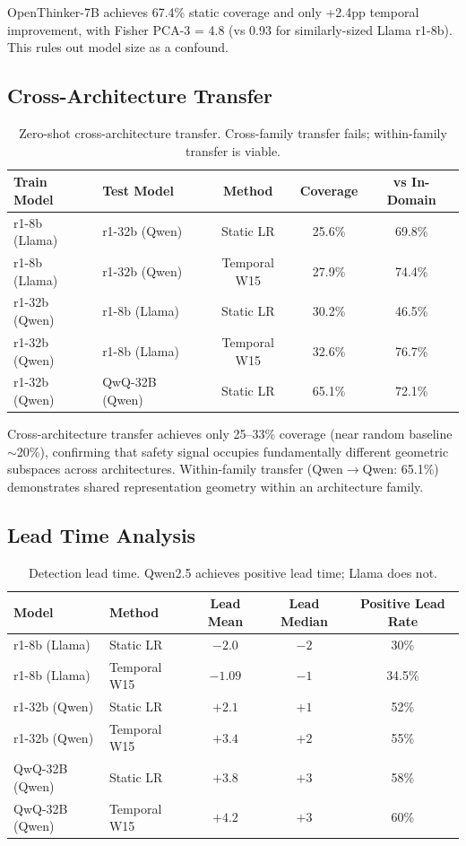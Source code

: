 \documentclass[11pt]{article}
\begin{document}
OpenThinker-7B achieves 67.4\% static coverage and only +2.4pp temporal improvement, with Fisher PCA-3 = 4.8 (vs 0.93 for similarly-sized Llama r1-8b). This rules out model size as a confound.

\subsection{Cross-Architecture Transfer}

\begin{table}[h]
\centering
\caption{Zero-shot cross-architecture transfer. Cross-family transfer fails; within-family transfer is viable.}
\label{tab:transfer}
\begin{tabular}{llccc}
\toprule
Train Model & Test Model & Method & Coverage & vs In-Domain \\
\midrule
r1-8b (Llama) & r1-32b (Qwen) & Static LR & 25.6\% & 69.8\% \\
r1-8b (Llama) & r1-32b (Qwen) & Temporal W15 & 27.9\% & 74.4\% \\
r1-32b (Qwen) & r1-8b (Llama) & Static LR & 30.2\% & 46.5\% \\
r1-32b (Qwen) & r1-8b (Llama) & Temporal W15 & 32.6\% & 76.7\% \\
r1-32b (Qwen) & QwQ-32B (Qwen) & Static LR & 65.1\% & 72.1\% \\
\bottomrule
\end{tabular}
\end{table}

Cross-architecture transfer achieves only 25--33\% coverage (near random baseline $\sim$20\%), confirming that safety signal occupies fundamentally different geometric subspaces across architectures. Within-family transfer (Qwen$\rightarrow$Qwen: 65.1\%) demonstrates shared representation geometry within an architecture family.

\subsection{Lead Time Analysis}

\begin{table}[h]
\centering
\caption{Detection lead time. Qwen2.5 achieves positive lead time; Llama does not.}
\label{tab:leadtime}
\begin{tabular}{llccc}
\toprule
Model & Method & Lead Mean & Lead Median & Positive Lead Rate \\
\midrule
r1-8b (Llama) & Static LR & $-2.0$ & $-2$ & 30\% \\
r1-8b (Llama) & Temporal W15 & $-1.09$ & $-1$ & 34.5\% \\
r1-32b (Qwen) & Static LR & $+2.1$ & $+1$ & 52\% \\
r1-32b (Qwen) & Temporal W15 & $+3.4$ & $+2$ & 55\% \\
QwQ-32B (Qwen) & Static LR & $+3.8$ & $+3$ & 58\% \\
QwQ-32B (Qwen) & Temporal W15 & $+4.2$ & $+3$ & 60\% \\
\bottomrule
\end{tabular}
\end{table}
\end{document}
